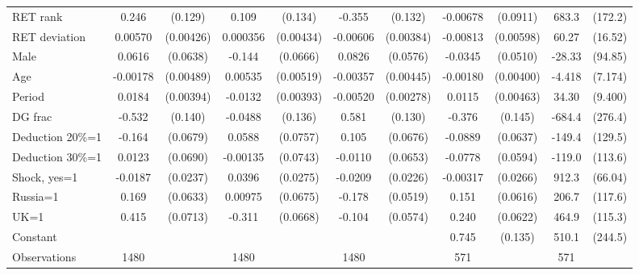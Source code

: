 \begin{tabular}{l|cccccc|cc|cc}
\hline
RET rank        &    0.246\sym{*}  &  (0.129)&    0.109         &  (0.134)&   -0.355\sym{***}&  (0.132)& -0.00678         & (0.0911)&    683.3\sym{***}&  (172.2)\\
RET deviation   &  0.00570         &(0.00426)& 0.000356         &(0.00434)& -0.00606         &(0.00384)& -0.00813         &(0.00598)&    60.27\sym{***}&  (16.52)\\
Male            &   0.0616         & (0.0638)&   -0.144\sym{**} & (0.0666)&   0.0826         & (0.0576)&  -0.0345         & (0.0510)&   -28.33         &  (94.85)\\
Age             & -0.00178         &(0.00489)&  0.00535         &(0.00519)& -0.00357         &(0.00445)& -0.00180         &(0.00400)&   -4.418         &  (7.174)\\
Period          &   0.0184\sym{***}&(0.00394)&  -0.0132\sym{***}&(0.00393)& -0.00520\sym{*}  &(0.00278)&   0.0115\sym{**} &(0.00463)&    34.30\sym{***}&  (9.400)\\
DG frac         &   -0.532\sym{***}&  (0.140)&  -0.0488         &  (0.136)&    0.581\sym{***}&  (0.130)&   -0.376\sym{**} &  (0.145)&   -684.4\sym{**} &  (276.4)\\
Deduction 20\%=1&   -0.164\sym{**} & (0.0679)&   0.0588         & (0.0757)&    0.105         & (0.0676)&  -0.0889         & (0.0637)&   -149.4         &  (129.5)\\
Deduction 30\%=1&   0.0123         & (0.0690)& -0.00135         & (0.0743)&  -0.0110         & (0.0653)&  -0.0778         & (0.0594)&   -119.0         &  (113.6)\\
Shock, yes=1    &  -0.0187         & (0.0237)&   0.0396         & (0.0275)&  -0.0209         & (0.0226)& -0.00317         & (0.0266)&    912.3\sym{***}&  (66.04)\\
Russia=1        &    0.169\sym{***}& (0.0633)&  0.00975         & (0.0675)&   -0.178\sym{***}& (0.0519)&    0.151\sym{**} & (0.0616)&    206.7\sym{*}  &  (117.6)\\
UK=1            &    0.415\sym{***}& (0.0713)&   -0.311\sym{***}& (0.0668)&   -0.104\sym{*}  & (0.0574)&    0.240\sym{***}& (0.0622)&    464.9\sym{***}&  (115.3)\\
Constant        &                  &         &                  &         &                  &         &    0.745\sym{***}&  (0.135)&    510.1\sym{**} &  (244.5)\\
\hline
Observations    &     1480         &         &     1480         &         &     1480         &         &      571         &         &      571         &         \\

\end{tabular}
